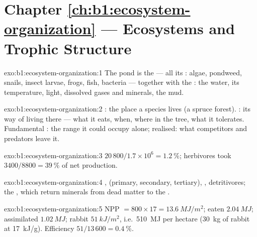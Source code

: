 \section*{Chapter \ref{ch:b1:ecosystem-organization} --- Ecosystems and Trophic Structure}

\begin{solution}{exo:b1:ecosystem-organization:1}
The pond  is the  --- all its : algae,
pondweed, snails, insect larvae, frogs, fish, bacteria --- together
with the : the water, its temperature, light, dissolved gases
and minerals, the mud.
\end{solution}

\begin{solution}{exo:b1:ecosystem-organization:2}
: the place a species lives (a spruce forest). : its way
of living there --- what it eats, when, where in the tree, what it
tolerates. Fundamental : the range it could occupy alone;
realised: what competitors and predators leave it.
\end{solution}

\begin{solution}{exo:b1:ecosystem-organization:3}
$20\,800/1.7\times 10^6 = \qty{1.2}{\%}$; herbivores took
$3400/8800 = \qty{39}{\%}$ of net production.
\end{solution}

\begin{solution}{exo:b1:ecosystem-organization:4}
,  (primary, secondary, tertiary), ,
detritivores; the , which return minerals from dead matter
to the .
\end{solution}

\begin{solution}{exo:b1:ecosystem-organization:5}
NPP $= 800\times 17 = \qty{13.6}{MJ/m^2}$; eaten $\qty{2.04}{MJ}$;
assimilated $\qty{1.02}{MJ}$; rabbit $\qty{51}{kJ/m^2}$, i.e.\
\qty{510}{MJ} per hectare (\qty{30}{kg} of rabbit at \qty{17}{kJ/g}).
Efficiency $51/13\,600 = \qty{0.4}{\%}$.
\end{solution}

